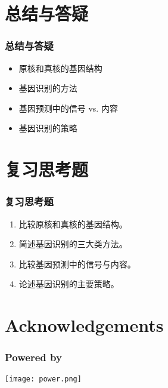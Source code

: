 \documentclass[table]{beamer}
\begin{document}
\section{总结与答疑}
\begin{frame}
  \frametitle{总结与答疑}
  \begin{itemize}
    \item 原核和真核的基因结构
    \item 基因识别的方法
    \item 基因预测中的信号 vs. 内容
    \item 基因识别的策略
  \end{itemize}
\end{frame}

\section{复习思考题}
\begin{frame}
  \frametitle{复习思考题}
  \begin{enumerate}
    \item 比较原核和真核的基因结构。
    \item 简述基因识别的三大类方法。
    \item 比较基因预测中的信号与内容。
    \item 论述基因识别的主要策略。
  \end{enumerate}
\end{frame}

\section*{Acknowledgements}
\begin{frame}
  \frametitle{Powered by}
  \begin{center}
    \texttt{[image: power.png]}
  \end{center}
\end{frame}
\end{document}
